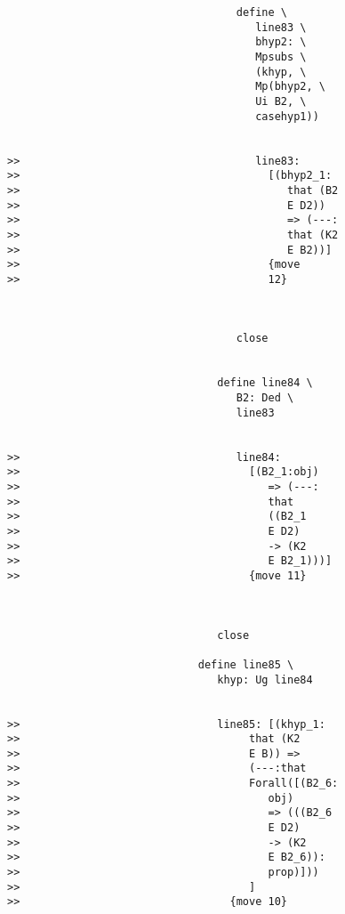\documentclass[12pt]{article}
\begin{document}
\begin{verbatim}
                                    define \
                                       line83 \
                                       bhyp2: \
                                       Mpsubs \
                                       (khyp, \
                                       Mp(bhyp2, \
                                       Ui B2, \
                                       casehyp1))


>>                                     line83:
>>                                       [(bhyp2_1:
>>                                          that (B2
>>                                          E D2))
>>                                          => (---:
>>                                          that (K2
>>                                          E B2))]
>>                                       {move
>>                                       12}



                                    close


                                 define line84 \
                                    B2: Ded \
                                    line83


>>                                  line84:
>>                                    [(B2_1:obj)
>>                                       => (---:
>>                                       that
>>                                       ((B2_1
>>                                       E D2)
>>                                       -> (K2
>>                                       E B2_1)))]
>>                                    {move 11}



                                 close

                              define line85 \
                                 khyp: Ug line84


>>                               line85: [(khyp_1:
>>                                    that (K2
>>                                    E B)) =>
>>                                    (---:that
>>                                    Forall([(B2_6:
>>                                       obj)
>>                                       => (((B2_6
>>                                       E D2)
>>                                       -> (K2
>>                                       E B2_6)):
>>                                       prop)]))
>>                                    ]
>>                                 {move 10}




\end{verbatim}
\end{document}
